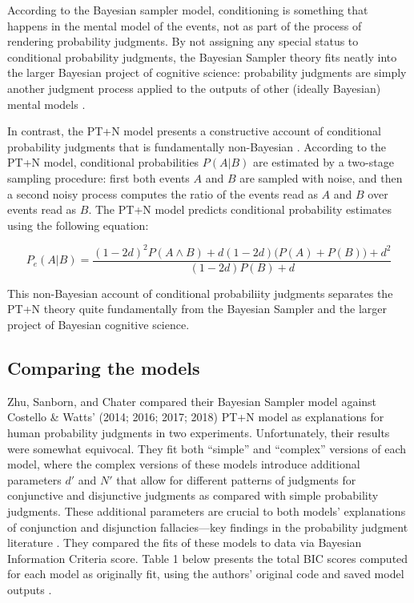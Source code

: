 \documentclass[
  english,
  man,floatsintext]{apa6}
\begin{document}
According to the Bayesian sampler model, conditioning is something that happens in the mental model of the events, not as part of the process of rendering probability judgments. By not assigning any special status to conditional probability judgments, the Bayesian Sampler theory fits neatly into the larger Bayesian project of cognitive science: probability judgments are simply another judgment process applied to the outputs of other (ideally Bayesian) mental models \autocite{chater.etal2020}.

In contrast, the PT+N model presents a constructive account of conditional probability judgments that is fundamentally non-Bayesian \autocite{costello.watts2016}. According to the PT+N model, conditional probabilities \(P(A|B)\) are estimated by a two-stage sampling procedure: first both events \(A\) and \(B\) are sampled with noise, and then a second noisy process computes the ratio of the events read as \(A\) and \(B\) over events read as \(B\). The PT+N model predicts conditional probability estimates using the following equation:

\[P_e(A|B) = \frac{(1-2d)^2P(A \land B) + d(1-2d)\big(P(A)+P(B)\big)+d^2}{(1-2d)P(B)+d}\]

This non-Bayesian account of conditional probabiliity judgments separates the PT+N theory quite fundamentally from the Bayesian Sampler and the larger project of Bayesian cognitive science.

\hypertarget{comparing-the-models}{%
\subsection{Comparing the models}\label{comparing-the-models}}

Zhu, Sanborn, and Chater \autocite*{zhu.etal2020} compared their Bayesian Sampler model against Costello \& Watts' (2014; 2016; 2017; 2018) PT+N model as explanations for human probability judgments in two experiments. Unfortunately, their results were somewhat equivocal. They fit both ``simple'' and ``complex'' versions of each model, where the complex versions of these models introduce additional parameters \(d'\) and \(N'\) that allow for different patterns of judgments for conjunctive and disjunctive judgments as compared with simple probability judgments. These additional parameters are crucial to both models' explanations of conjunction and disjunction fallacies---key findings in the probability judgment literature \autocite{costello.watts2017,zhu.etal2020}. They compared the fits of these models to data via Bayesian Information Criteria score. Table 1 below presents the total BIC scores computed for each model as originally fit, using the authors' original code and saved model outputs \autocite[Supplementary materials]{zhu.etal2020}.
\end{document}
